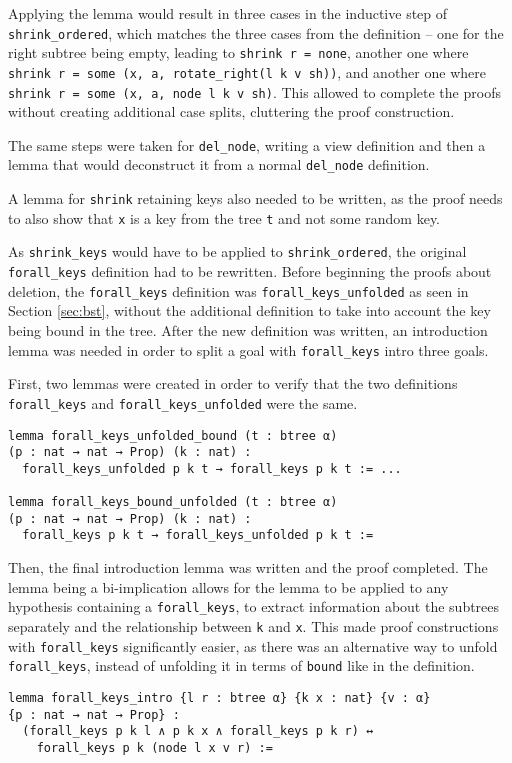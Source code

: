 Applying the lemma would result in three cases in the inductive step of \lstinline{shrink_ordered}, which matches the three cases from the definition -- one for the right subtree being empty, leading to \lstinline{shrink r = none}, another one where \lstinline{shrink r = some (x, a, rotate_right(l k v sh))}, and another one where \lstinline{shrink r = some (x, a, node l k v sh)}. This allowed to complete the proofs without creating additional case splits, cluttering the proof construction.

The same steps were taken for \lstinline{del_node}, writing a view definition and then a lemma that would deconstruct it from a normal \lstinline{del_node} definition.

A lemma for \lstinline{shrink} retaining keys also needed to be written, as the proof needs to also show that \lstinline{x} is a key from the tree \lstinline{t} and not some random key.

As \lstinline{shrink_keys} would have to be applied to \lstinline{shrink_ordered}, the original \lstinline{forall_keys} definition had to be rewritten. Before beginning the proofs about deletion, the \lstinline{forall_keys} definition was \lstinline{forall_keys_unfolded} as seen in Section \ref{sec:bst}, without the additional definition to take into account the key being bound in the tree. After the new definition was written, an introduction lemma was needed in order to split a goal with \lstinline{forall_keys} intro three goals. 

First, two lemmas were created in order to verify that the two definitions \lstinline{forall_keys} and \lstinline{forall_keys_unfolded} were the same. 

\begin{lstlisting}
lemma forall_keys_unfolded_bound (t : btree α) 
(p : nat → nat → Prop) (k : nat) :
  forall_keys_unfolded p k t → forall_keys p k t := ...

lemma forall_keys_bound_unfolded (t : btree α) 
(p : nat → nat → Prop) (k : nat) :
  forall_keys p k t → forall_keys_unfolded p k t :=
\end{lstlisting}

Then, the final introduction lemma was written and the proof completed. The lemma being a bi-implication allows for the lemma to be applied to any hypothesis containing a \lstinline{forall_keys}, to extract information about the subtrees separately and the relationship between \lstinline{k} and \lstinline{x}. This made proof constructions with \lstinline{forall_keys} significantly easier, as there was an alternative way to unfold \lstinline{forall_keys}, instead of unfolding it in terms of \lstinline{bound} like in the definition. 

\begin{lstlisting}
lemma forall_keys_intro {l r : btree α} {k x : nat} {v : α} 
{p : nat → nat → Prop} :
  (forall_keys p k l ∧ p k x ∧ forall_keys p k r) ↔ 
    forall_keys p k (node l x v r) :=
\end{lstlisting}